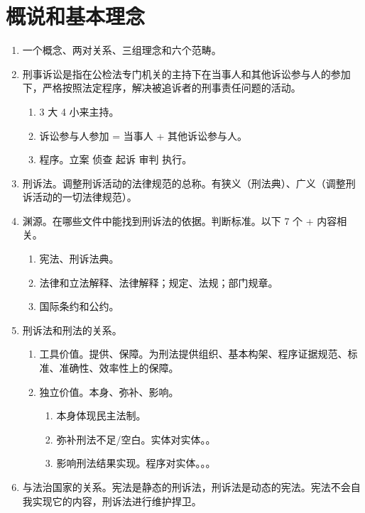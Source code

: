 \section{概说和基本理念}
\begin{enumerate}
  \item 一个概念、两对关系、三组理念和六个范畴。
  \item 刑事诉讼是指在公检法专门机关的主持下在当事人和其他诉讼参与人的参加下，严格按照法定程序，解决被追诉者的刑事责任问题的活动。
        \begin{enumerate}
          \item 3 大 4 小来主持。
          \item 诉讼参与人参加 = 当事人 + 其他诉讼参与人。
          \item 程序。立案 \yjt 侦查 \yjt 起诉 \yjt 审判 \yjt 执行。
        \end{enumerate}
  \item 刑诉法。调整刑诉活动的法律规范的总称。有狭义（刑法典）、广义（调整刑诉活动的一切法律规范）。
  \item 渊源。在哪些文件中能找到刑诉法的依据。判断标准。以下 7 个 + 内容相关。
        \begin{enumerate}
          \item 宪法、刑诉法典。
          \item 法律和立法解释、法律解释；规定、法规；部门规章。
          \item 国际条约和公约。
        \end{enumerate}
  \item 刑诉法和刑法的关系。
        \begin{enumerate}
          \item 工具价值。提供、保障。为刑法提供组织、基本构架、程序证据规范、标准、准确性、效率性上的保障。
          \item 独立价值。本身、弥补、影响。
                \begin{enumerate}
                  \item 本身体现民主法制。
                  \item 弥补刑法不足/空白。实体对实体。。
                  \item 影响刑法结果实现。程序对实体。。。
                \end{enumerate}
        \end{enumerate}
  \item 与法治国家的关系。宪法是静态的刑诉法，刑诉法是动态的宪法。宪法不会自我实现它的内容，刑诉法进行维护捍卫。

\end{enumerate}
